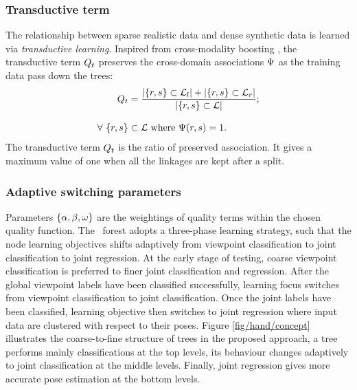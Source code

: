 \subsubsection{Transductive term} 
The relationship between sparse realistic data and dense synthetic data is learned via \emph{transductive learning}. Inspired from cross-modality boosting \cite{Bronstein2010}, the transductive term $Q_{t}$ preserves the cross-domain associations $\mathrm{\Psi}$ as the training data pass down the trees: 
\begin{equation}
	\begin{split}
		Q_{t} &= 
		\frac{|\{r,s\} \subset \mathcal{L}_{l}| +  
		|\{r,s\} \subset \mathcal{L}_{r}|}{|\{r,s\} \subset \mathcal{L}|}; \\[3mm]   
		\forall\ \{r,s\} & \subset \mathcal{L} \mbox{ where } \mathrm{\Psi}(r,s) = 1.
	\end{split}
\end{equation}
The transductive term $Q_{t}$ is the ratio of preserved association. It gives a maximum value of one when all the linkages are kept after a split.   

\subsubsection{Adaptive switching parameters} 
Parameters $\{ \alpha, \beta, \omega \}$ are the weightings of quality terms within the chosen quality function.   
The \STR\ forest adopts a three-phase learning strategy, such that the node learning objectives shifts adaptively from viewpoint classification to joint classification to joint regression. 
At the early stage of testing, coarse viewpoint classification is preferred to finer joint classification and regression. 
After the global viewpoint labels have been classified successfully, learning focus switches from viewpoint classification to joint classification. 
Once the joint labels have been classified, learning objective then switches to joint regression where input data are clustered with respect to their poses.  
Figure \ref{fig/hand/concept} illustrates the coarse-to-fine structure of trees in the proposed approach, a tree performs mainly classifications at the top levels, its behaviour changes adaptively to joint classification at the middle levels. Finally, joint regression gives more accurate pose estimation at the bottom levels. 

